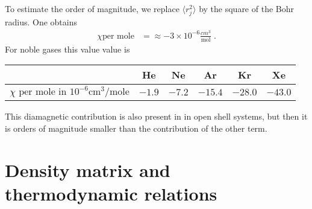 To estimate the order of magnitude, we replace $\langle r_{j}^{2}\rangle$ by the square of the Bohr radius.
One obtains 
%
\begin{align*}
\chi \text{per mole} &= \approx - 3 \times 10^{-6}\frac{cm^{3}}{\text{mol}}\;.
\end{align*}
%
For noble gases this value value is
\begin{table}
\begin{tabular}{l|ccccc}
  \hline
  & He& Ne&Ar&Kr&Xe\\
  \hline
$\chi \text{ per mole in } 10^{-6} \text{cm}^{3}/\text{mole}$& $-1.9$&$-7.2$&$-15.4$&$-28.0$&$-43.0$ \\
  \hline
\end{tabular}
\end{table}
% 
This diamagnetic contribution is also present in in open shell systems, but then it is orders of magnitude smaller than the contribution of the other term.

\section{Density matrix and thermodynamic relations}

